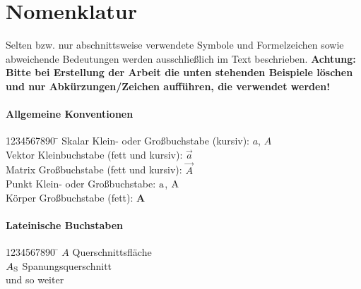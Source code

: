 \chapter*{Nomenklatur}
Selten bzw. nur abschnittsweise verwendete Symbole und Formelzeichen sowie abweichende Bedeutungen werden ausschließlich im Text beschrieben. \textbf{Achtung: Bitte bei Erstellung der Arbeit die unten stehenden Beispiele löschen und nur Abkürzungen/Zeichen aufführen, die verwendet werden!}
\subsubsection{Allgemeine Konventionen}\vspace{-3mm}
\begin{tabbing}
	1234567890 \= \kill
	Skalar \> Klein- oder Großbuchstabe (kursiv): $a$, $A$    \\
	Vektor \> Kleinbuchstabe (fett und kursiv): $\vec{a}$     \\
	Matrix \> Großbuchstabe (fett und kursiv): $\vec{A}$      \\
	Punkt  \> Klein- oder Großbuchstabe: ${\mathrm{a}}$, ${\mathrm{A}}$ \\
	Körper \> Großbuchstabe (fett): \textbf{A}              
\end{tabbing}
\subsubsection{Lateinische Buchstaben}\vspace{-3mm}
\begin{tabbing}
	1234567890 \= \kill
	$A$																		\> Querschnittsfläche \\
	$A_{\mathrm{S}}$                           \> Spanungsquerschnitt \\
	und so weiter
\end{tabbing}
